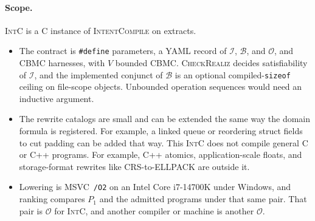 \paragraph{Scope.}
\textsc{IntC} is a C instance of \textsc{IntentCompile} on extracts.
\begin{itemize}
  \item The contract is \texttt{\#define} parameters, a YAML record of
  \(\mathcal{I}\), \(\mathcal{B}\), and \(\mathcal{O}\), and CBMC harnesses,
  with \(V\) bounded CBMC. \textsc{CheckRealiz} decides satisfiability of
  \(\mathcal{I}\), and the implemented conjunct of \(\mathcal{B}\) is an
  optional compiled-\texttt{sizeof} ceiling on file-scope objects.
  Unbounded operation sequences would need an inductive argument.
  \item The rewrite catalogs are small and can be extended the same way
  the domain formula is registered. For example, a linked queue or
  reordering struct fields to cut padding can be added that way. This
  \textsc{IntC} does not compile general C or C++ programs. For example, C++
  atomics, application-scale floats, and storage-format rewrites like
  CRS-to-ELLPACK are outside it.
  \item Lowering is MSVC~\texttt{/O2} on an Intel Core i7-14700K under
  Windows, and ranking compares \(P_1\) and the admitted programs under
  that same pair. That pair is \(\mathcal{O}\) for \textsc{IntC}, and
  another compiler or machine is another \(\mathcal{O}\).
\end{itemize}
